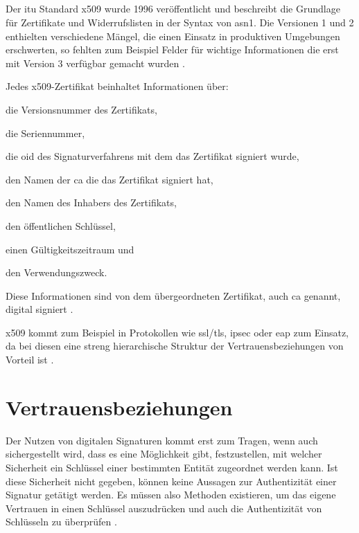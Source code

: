 \subsection{}
\label{sec:GrundlagenDefinitionen:DigitaleSignaturen:Verfahren:x509}
Der \gls{itu} Standard \gls{x509} wurde 1996 veröffentlicht und beschreibt die Grundlage für Zertifikate und Widerrufslisten in der Syntax von \gls{asn1}. Die
Versionen 1 und 2 enthielten verschiedene Mängel, die einen Einsatz in produktiven Umgebungen erschwerten, so fehlten zum Beispiel Felder für wichtige
Informationen die erst mit Version 3 verfügbar gemacht wurden \cite{krypto-pki-internet}.

Jedes \gls{x509}-Zertifikat beinhaltet Informationen über:
\begin{itemize*}
    \item die Versionsnummer des Zertifikats,
    \item die Seriennummer,
    \item die \gls{oid} des Signaturverfahrens mit dem das Zertifikat signiert wurde,
    \item den Namen der \gls{ca} die das Zertifikat signiert hat,
    \item den Namen des Inhabers des Zertifikats,
    \item den öffentlichen Schlüssel,
    \item einen Gültigkeitszeitraum und
    \item den Verwendungszweck.
\end{itemize*}

Diese Informationen sind von dem übergeordneten Zertifikat, auch \gls{ca} genannt, digital signiert \cite{x509:ietf}.

\gls{x509} kommt zum Beispiel in Protokollen wie \gls{ssl}/\gls{tls}, \gls{ipsec} oder \gls{eap} zum Einsatz, da bei diesen eine streng hierarchische Struktur
der Vertrauensbeziehungen von Vorteil ist \cite{kits,tls:ietf}.

\section{Vertrauensbeziehungen}
\label{sec:GrundlagenDefinitionen:Vertrauen}
Der Nutzen von digitalen Signaturen kommt erst zum Tragen, wenn auch sichergestellt wird, dass es eine Möglichkeit gibt, festzustellen, mit welcher Sicherheit
ein Schlüssel einer bestimmten Entität zugeordnet werden kann. Ist diese Sicherheit nicht gegeben, können keine Aussagen zur Authentizität einer Signatur
getätigt werden. Es müssen also Methoden existieren, um das eigene Vertrauen in einen Schlüssel auszudrücken und auch die Authentizität von Schlüsseln
zu überprüfen \cite{krypto-pki-internet}.

